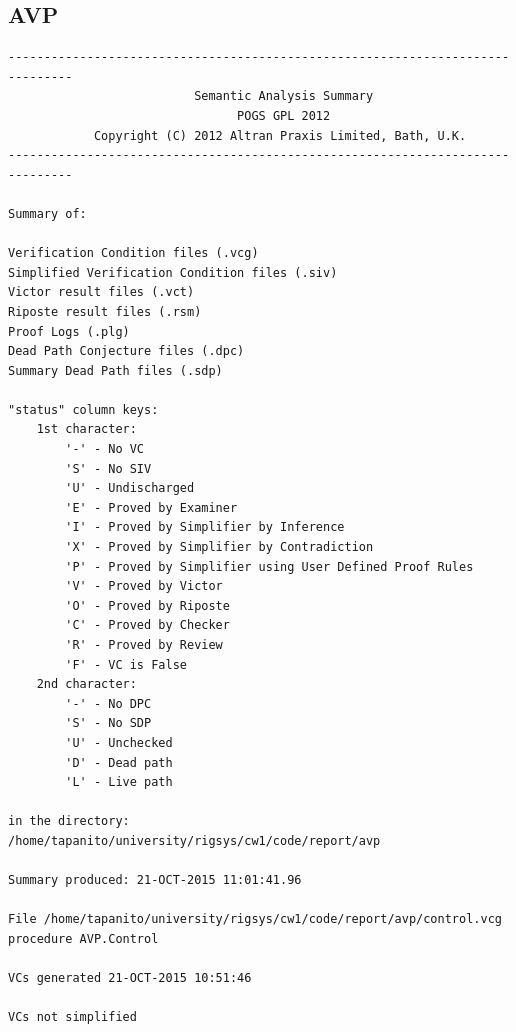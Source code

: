 \documentclass[a4paper, titlepage]{article}
\begin{document}
\subsection{AVP}
{\small
\begin{lstlisting}
-------------------------------------------------------------------------------
                          Semantic Analysis Summary                            
                                POGS GPL 2012                                  
            Copyright (C) 2012 Altran Praxis Limited, Bath, U.K.               
-------------------------------------------------------------------------------

Summary of:

Verification Condition files (.vcg)
Simplified Verification Condition files (.siv)
Victor result files (.vct)
Riposte result files (.rsm)
Proof Logs (.plg)
Dead Path Conjecture files (.dpc)
Summary Dead Path files (.sdp)

"status" column keys:
    1st character:
        '-' - No VC
        'S' - No SIV
        'U' - Undischarged
        'E' - Proved by Examiner
        'I' - Proved by Simplifier by Inference
        'X' - Proved by Simplifier by Contradiction
        'P' - Proved by Simplifier using User Defined Proof Rules
        'V' - Proved by Victor
        'O' - Proved by Riposte
        'C' - Proved by Checker
        'R' - Proved by Review
        'F' - VC is False
    2nd character:
        '-' - No DPC
        'S' - No SDP
        'U' - Unchecked
        'D' - Dead path
        'L' - Live path

in the directory:
/home/tapanito/university/rigsys/cw1/code/report/avp

Summary produced: 21-OCT-2015 11:01:41.96

File /home/tapanito/university/rigsys/cw1/code/report/avp/control.vcg
procedure AVP.Control

VCs generated 21-OCT-2015 10:51:46

VCs not simplified


\end{lstlisting}}
\end{document}
